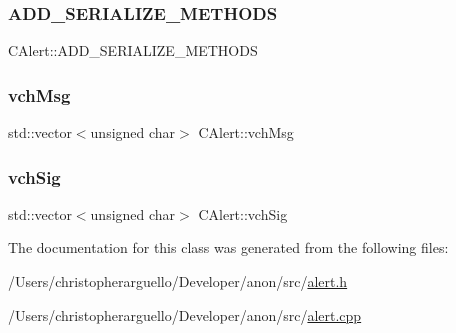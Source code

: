 \subsubsection{\texorpdfstring{A\+D\+D\+\_\+\+S\+E\+R\+I\+A\+L\+I\+Z\+E\+\_\+\+M\+E\+T\+H\+O\+DS}{ADD\_SERIALIZE\_METHODS}}
{\footnotesize\ttfamily C\+Alert\+::\+A\+D\+D\+\_\+\+S\+E\+R\+I\+A\+L\+I\+Z\+E\+\_\+\+M\+E\+T\+H\+O\+DS}

\mbox{\label{class_c_alert_abfcb3b339d052cd3dd6670b03286758a}} 
\subsubsection{\texorpdfstring{vch\+Msg}{vchMsg}}
{\footnotesize\ttfamily std\+::vector$<$unsigned char$>$ C\+Alert\+::vch\+Msg}

\mbox{\label{class_c_alert_a541b49670ebf387a5f8b7de59277fed0}} 
\subsubsection{\texorpdfstring{vch\+Sig}{vchSig}}
{\footnotesize\ttfamily std\+::vector$<$unsigned char$>$ C\+Alert\+::vch\+Sig}



The documentation for this class was generated from the following files\+:\begin{DoxyCompactItemize}
\item 
/\+Users/christopherarguello/\+Developer/anon/src/\mbox{\hyperlink{alert_8h}{alert.\+h}}\item 
/\+Users/christopherarguello/\+Developer/anon/src/\mbox{\hyperlink{alert_8cpp}{alert.\+cpp}}\end{DoxyCompactItemize}

